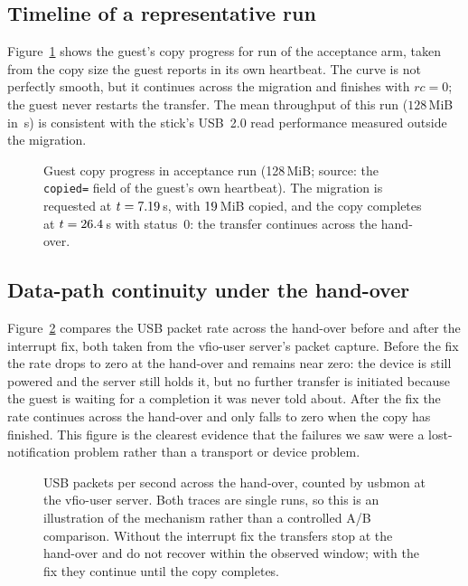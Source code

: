 \documentclass[10pt,conference]{IEEEtran}
\newcommand{\code}[1]{\texttt{#1}}
\begin{document}
\subsection{Timeline of a representative run}
Figure~\ref{fig:copy} shows the guest's copy progress for run \ProgressRun{} of
the acceptance arm, taken from the copy size the guest reports in its own
heartbeat. The curve is not perfectly smooth, but it continues across the
migration and finishes with $rc=0$; the guest never restarts the transfer. The
mean throughput of this run ($128$\,MiB in \ProgressCopyDuration\,s) is
consistent with the stick's USB~2.0 read performance measured outside the
migration.

\begin{figure}[t]
\centering

\caption{Guest copy progress in acceptance run \ProgressRun{} (128\,MiB;
source: the \code{copied=} field of the guest's own heartbeat). The
migration is requested at $t=7.19$\,s, with
$19$\,MiB copied, and the copy completes at
$t=26.4$\,s with status~0: the transfer continues across the
hand-over.}
\label{fig:copy}
\end{figure}

\subsection{Data-path continuity under the hand-over}
\label{sec:rate}
Figure~\ref{fig:rate} compares the USB packet rate across the hand-over
before and after the interrupt fix, both taken from the vfio-user server's
packet capture. Before the fix the rate drops to zero at the hand-over and remains near zero: the device is still powered and the server still holds it, but no
further transfer is initiated because the guest is waiting for a completion it
was never told about. After the fix the rate continues across the hand-over and
only falls to zero when the copy has finished. This figure is the clearest
evidence that the failures we saw were a lost-notification problem rather than
a transport or device problem.

\begin{figure}[t]
\centering

\caption{USB packets per second across the hand-over, counted by usbmon at the
vfio-user server. Both traces are single runs, so this is an illustration of the
mechanism rather than a controlled A/B comparison. Without the interrupt fix the
transfers stop at the hand-over and do not recover within the observed window; with the fix they continue until the copy completes.}
\label{fig:rate}
\end{figure}
\end{document}
